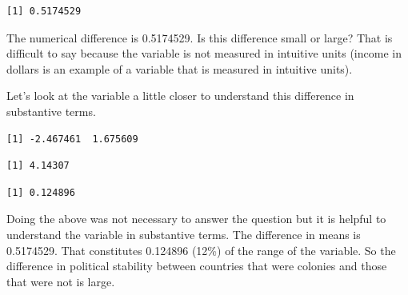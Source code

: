\documentclass[]{article}
\newenvironment{Shaded}{\begin{snugshade}}{\end{snugshade}}
\newcommand{\KeywordTok}[1]{\textcolor[rgb]{0.13,0.29,0.53}{\textbf{#1}}}
\newcommand{\StringTok}[1]{\textcolor[rgb]{0.31,0.60,0.02}{#1}}
\newcommand{\CommentTok}[1]{\textcolor[rgb]{0.56,0.35,0.01}{\textit{#1}}}
\newcommand{\OperatorTok}[1]{\textcolor[rgb]{0.81,0.36,0.00}{\textbf{#1}}}
\newcommand{\NormalTok}[1]{#1}
\theoremstyle{definition}
\theoremstyle{definition}
\theoremstyle{definition}
\theoremstyle{remark}
\begin{document}
\begin{verbatim}
[1] 0.5174529
\end{verbatim}

The numerical difference is 0.5174529. Is this difference small or
large? That is difficult to say because the variable is not measured in
intuitive units (income in dollars is an example of a variable that is
measured in intuitive units).

Let's look at the variable a little closer to understand this difference
in substantive terms.

\begin{Shaded}
\end{Shaded}

\begin{verbatim}
[1] -2.467461  1.675609
\end{verbatim}

\begin{Shaded}
\end{Shaded}

\begin{verbatim}
[1] 4.14307
\end{verbatim}

\begin{Shaded}
\end{Shaded}

\begin{verbatim}
[1] 0.124896
\end{verbatim}

Doing the above was not necessary to answer the question but it is
helpful to understand the variable in substantive terms. The difference
in means is 0.5174529. That constitutes 0.124896 (12\%) of the range of
the variable. So the difference in political stability between countries
that were colonies and those that were not is large.
\end{document}

